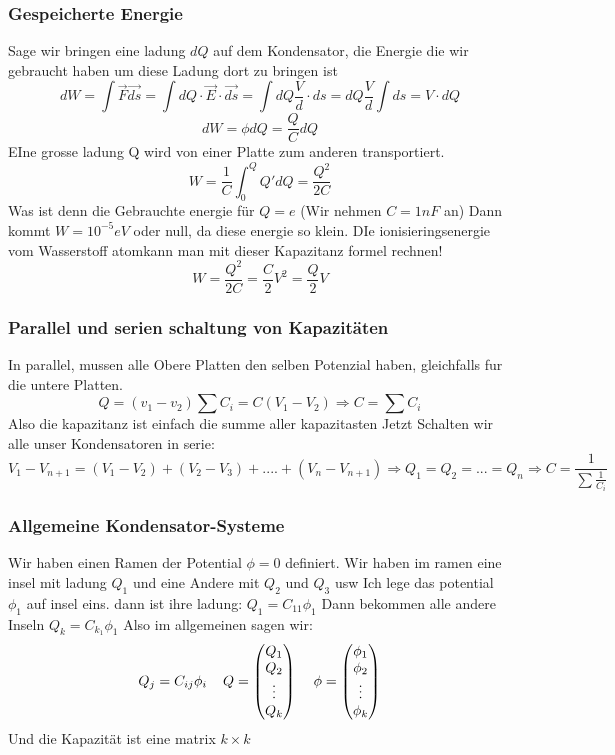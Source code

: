 \documentclass{article}
\newcommand{\mspc}{\hspace{0.4cm}}
\begin{document}
\subsubsection{Gespeicherte Energie} Sage wir bringen eine ladung $dQ$ auf dem Kondensator, die Energie die wir gebraucht haben um diese Ladung dort zu bringen ist
\[dW=\int\vec{F}\vec{ds}=\int dQ\cdot \vec{E}\cdot \vec{ds}=\int dQ\frac{V}{d}\cdot ds=dQ\frac{V}{d}\int ds=V\cdot dQ\]
\[dW=\phi dQ=\frac{Q}{C}dQ\] EIne grosse ladung Q wird von einer Platte zum anderen transportiert.
\[W=\frac{1}{C}\int_0^Q Q'dQ=\frac{Q^2}{2C}\]
Was ist denn die Gebrauchte energie für $Q= e$ (Wir nehmen $C=1nF$ an) Dann kommt $W=10^{-5}eV$ oder null, da diese energie so klein.
\newline DIe ionisieringsenergie vom Wasserstoff atomkann man mit dieser Kapazitanz formel rechnen!
\[W=\frac{Q^2}{2C}=\frac{C}{2}V^2=\frac{Q}{2}V\]
\subsubsection{Parallel und serien schaltung von Kapazitäten} In parallel, mussen alle Obere Platten den selben Potenzial haben, gleichfalls fur die untere Platten.
\[Q=(v_1-v_2)\sum C_i=C(V_1-V_2)\Rightarrow C=\sum C_i\] Also die kapazitanz ist einfach die summe aller kapazitasten
\newline Jetzt Schalten wir alle unser Kondensatoren in serie:
\[V_1-V_{n+1}=(V_1-V_2)+(V_2-V_3)+....+(V_n-V_{n+1})\Rightarrow Q_1=Q_2=...=Q_n\Rightarrow C=\frac{1}{\sum\frac{1}{C_i}}\]
\subsubsection{Allgemeine Kondensator-Systeme} Wir haben einen Ramen der Potential $\phi=0$ definiert. Wir haben im ramen eine insel mit ladung $Q_1$ und eine Andere mit $Q_2$ und $Q_3$ usw
Ich lege das potential $\phi_1$ auf insel eins. dann ist ihre ladung: $Q_1=C_{11}\phi_1$ Dann bekommen alle andere Inseln $Q_k=C_{k_1}\phi_1$ Also im allgemeinen sagen wir:
\[Q_j=C_{ij}\phi_i\mspc Q=\begin{pmatrix}Q_1\\Q_2\\\vdots\\Q_k\end{pmatrix}\mspc \phi=\begin{pmatrix}\phi_1\\\phi_2\\\vdots\\\phi_k\end{pmatrix}\]
Und die Kapazität ist eine matrix $k\times k$
\end{document}

